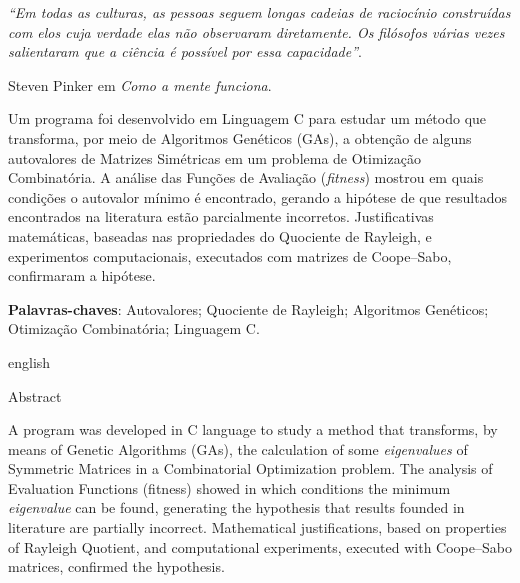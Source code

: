 \begin{epigrafe}
	\thispagestyle{empty}
    \vspace*{\fill}
	\begin{flushright}
		\textit{``Em todas as culturas, as pessoas seguem longas cadeias de raciocínio construídas com elos cuja verdade elas não observaram diretamente. Os filósofos várias vezes salientaram que a ciência é possível por essa capacidade”}.
		
		\vspace{0.5cm}
		
		Steven Pinker em \textit{Como a mente funciona}.
	\end{flushright}
\end{epigrafe}


\thispagestyle{empty}
\begin{resumo}
Um programa foi desenvolvido em Linguagem C para estudar um método que transforma, por meio de Algoritmos Genéticos (GAs), a obtenção de alguns autovalores de Matrizes Simétricas em um problema de Otimização Combinatória. A análise das Funções de Avaliação (\emph{fitness}) mostrou em quais condições o autovalor mínimo é encontrado, gerando a hipótese de que resultados encontrados na literatura estão parcialmente incorretos. Justificativas matemáticas, baseadas nas propriedades do Quociente de Rayleigh, e experimentos computacionais, executados com matrizes de Coope--Sabo, confirmaram a hipótese.
     
    \vspace{\onelineskip}

    \noindent\textbf{Palavras-chaves}: Autovalores; Quociente de Rayleigh; Algoritmos Genéticos; Otimização Combinatória; Linguagem C.

    \vspace{\onelineskip}
    \vspace{\onelineskip}
		
    \begin{otherlanguage*}{english}
    \begin{center}{\ABNTEXchapterfont\huge Abstract}\end{center}
    
    A program was developed in C language to study a method that transforms, by means of Genetic Algorithms (GAs), the calculation of some \emph{eigenvalues} of Symmetric Matrices in a Combinatorial Optimization problem. The analysis of Evaluation Functions (fitness) showed in which conditions the minimum \emph{eigenvalue} can be found, generating the hypothesis that results founded in literature are partially incorrect. Mathematical justifications, based on properties of Rayleigh Quotient, and computational experiments, executed with Coope--Sabo matrices, confirmed the hypothesis.
		

\end{otherlanguage*}
\end{resumo}
